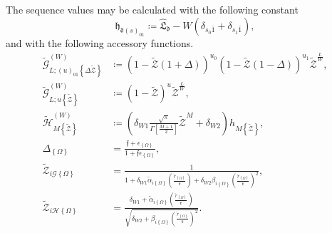The sequence values may be calculated with the following constant
\begin{equation}
\mathfrak{h}_{\mathfrak{d}\left(s\right)_{01}}
    \coloneqq
        \hat{\mathfrak{L}}_{\mathfrak{d}}
        - W\left(\delta_{s_{0}\bar{1}} + \delta_{s_{1}\bar{1}}\right)
,
\end{equation}
and with the following accessory functions.
\begin{align}
\tilde{\mathcal{G}}
_{L;\left(u\right)_{01}\left\{\Delta\tilde{\mathcal{Z}}\right\}}
^{\left(W\right)}
    &\coloneqq
        \left(1-\tilde{\mathcal{Z}}\left(1+\Delta\right)\right)^{u_{0}}
        \left(1-\tilde{\mathcal{Z}}\left(1-\Delta\right)\right)^{u_{1}}
        \tilde{\mathcal{Z}}^{\frac{L}{W}}
,\\
\tilde{\mathcal{G}}
_{L;u\left\{\tilde{\mathcal{Z}}\right\}}
^{\left(W\right)}
    &\coloneqq
        \left(1-\tilde{\mathcal{Z}}\right)^{u}
        \tilde{\mathcal{Z}}^{\frac{L}{W}}
,\\
\tilde{\mathcal{H}}_{M\left\{\tilde{\mathcal{Z}}\right\}}^{\left(W\right)}
    &\coloneqq
        \left(
            \delta_{W1}
            \frac{\sqrt{\pi}}{\Gamma\left[\frac{M+1}{2}\right]}
            \tilde{\mathcal{Z}}^{M}
            +
            \delta_{W2}
        \right)
        h_{M\left\{\tilde{\mathcal{Z}}\right\}}
,\\
\Delta_{\left\{\Omega\right\}}
    &=
        \frac
        { \mathfrak{f}+\epsilon_{\left\{\Omega\right\}} }
        { 1 + \mathfrak{f}\epsilon_{\left\{\Omega\right\}} }
,\\
\tilde{\mathcal{Z}}_{i\mathcal{G}\left\{\Omega\right\}}
&=
    \frac
    {1}
    {
        1
            +
        \delta_{W1}
        \tilde{\alpha}_{i\left\{\Omega\right\}}
        \left(\frac{ \check{r}_{\left\{\Omega\right\}} }{ \mathfrak{r} }\right)
            +
        \delta_{W2}
        \beta_{i\left\{\Omega\right\}}
        \left(
            \frac{ \check{r}_{\left\{\Omega\right\}} }{ \mathfrak{r} }
        \right)^{2}
    }
,\\
\tilde{\mathcal{Z}}_{i\mathcal{H}\left\{\Omega\right\}}
&=
    \frac
    {
        \delta_{W1}
            +
        \tilde{\alpha}_{i\left\{\Omega\right\}}
        \left(\frac{ \check{r}_{\left\{\Omega\right\}} }{ \mathfrak{r} }\right)
    }
    {
        \sqrt{
            \delta_{W2}
                +
            \beta_{i\left\{\Omega\right\}}
            \left(
                \frac{ \check{r}_{\left\{\Omega\right\}} }{ \mathfrak{r} }
            \right)^{2}
        }
    }    
.
\end{align}